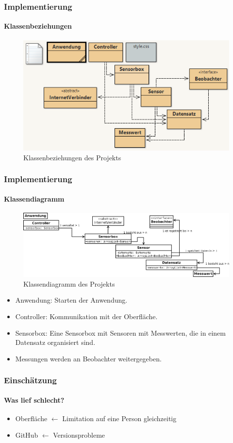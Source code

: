 \documentclass[notes]{beamer}
\begin{document}
	\begin{frame}
		\frametitle{Implementierung}
		\framesubtitle{Klassenbeziehungen}
		\begin{figure}
			\centering
			\includegraphics[width = .75\textwidth]{Abbildungen/klassenbeziehungen}
			\caption{Klassenbeziehungen des Projekts}
		\end{figure}
	\end{frame}
	\begin{frame}
		\frametitle{Implementierung}
		\framesubtitle{Klassendiagramm}
		\begin{figure}
			\centering
			\includegraphics[width = \textwidth]{Abbildungen/klassendiagramm}
			\caption{Klassendiagramm des Projekts}
		\end{figure}
	\end{frame}
	\note
	{
		\begin{itemize}
			\item Anwendung: Starten der Anwendung.
			\item Controller: Kommunikation mit der Oberfläche.
			\item Sensorbox: Eine Sensorbox mit Sensoren mit Messwerten, die in einem Datensatz organisiert sind.
			\item Messungen werden an Beobachter weitergegeben.
		\end{itemize}
	}
	\begin{frame}
		\frametitle{Einschätzung}
		\framesubtitle{Was lief schlecht?}
		\begin{itemize}
			\item Oberfläche $\leftarrow$ Limitation auf eine Person gleichzeitig
			\item GitHub $\leftarrow$ Versionsprobleme
		\end{itemize}
	\end{frame}
\end{document}
